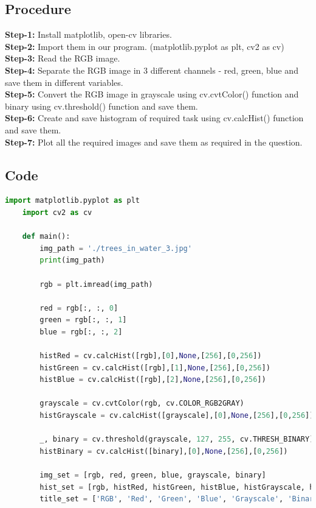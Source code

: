 \documentclass{article}
\begin{document}
{    \subsection{Procedure}
    \textbf{Step-1:}
    Install matplotlib, open-cv libraries.\\
    \textbf{Step-2:}
    Import them in our program. (matplotlib.pyplot as plt, cv2 as cv)\\
    \textbf{Step-3:}
    Read the RGB image.\\
    \textbf{Step-4:}
    Separate the RGB image in 3 different channels - red, green, blue and save them in different variables.\\
    \textbf{Step-5:}
    Convert the RGB image in grayscale using cv.cvtColor() function and binary using cv.threshold() function and save them.\\
    \textbf{Step-6:}
    Create and save histogram of required task using cv.calcHist() function and save them.\\
    \textbf{Step-7:}
    Plot all the required images and save them as required in the question.\\
    
    \subsection{Code}
    \lstset{style=mystyle}
    \begin{lstlisting}[language=Python, caption=Code for histogram and picture of different channels]
    import matplotlib.pyplot as plt
    import cv2 as cv
    
    def main():
    	img_path = './trees_in_water_3.jpg'
    	print(img_path)
    	
    	rgb = plt.imread(img_path)
    
    	red = rgb[:, :, 0]
    	green = rgb[:, :, 1]
    	blue = rgb[:, :, 2]
    
    	histRed = cv.calcHist([rgb],[0],None,[256],[0,256])
    	histGreen = cv.calcHist([rgb],[1],None,[256],[0,256])
    	histBlue = cv.calcHist([rgb],[2],None,[256],[0,256])
    
    	grayscale = cv.cvtColor(rgb, cv.COLOR_RGB2GRAY)
    	histGrayscale = cv.calcHist([grayscale],[0],None,[256],[0,256])
    
    	_, binary = cv.threshold(grayscale, 127, 255, cv.THRESH_BINARY)
    	histBinary = cv.calcHist([binary],[0],None,[256],[0,256])
    
    	img_set = [rgb, red, green, blue, grayscale, binary]
    	hist_set = [rgb, histRed, histGreen, histBlue, histGrayscale, histBinary]
    	title_set = ['RGB', 'Red', 'Green', 'Blue', 'Grayscale', 'Binary']
    	

\end{lstlisting}}
\end{document}
